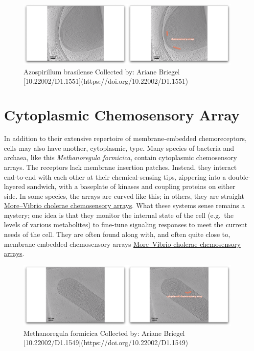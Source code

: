 \documentclass[]{tufte-book}
\begin{document}
\begin{figure}
\includegraphics{movie_stills/7_4a} \caption[Azospirillum brasilense Collected by]{Azospirillum brasilense Collected by: Ariane Briegel [10.22002/D1.1551](https://doi.org/10.22002/D1.1551)}\label{fig:unnamed-chunk-128}
\end{figure}

\section{Cytoplasmic Chemosensory
Array}\label{cytoplasmic-chemosensory-array}

In addition to their extensive repertoire of membrane-embedded
chemoreceptors, cells may also have another, cytoplasmic, type. Many
species of bacteria and archaea, like this \emph{Methanoregula
formicica}, contain cytoplasmic chemosensory arrays. The receptors lack
membrane insertion patches. Instead, they interact end-to-end with each
other at their chemical-sensing tips, zippering into a double-layered
sandwich, with a baseplate of kinases and coupling proteins on either
side. In some species, the arrays are curved like this; in others, they
are straight
\protect\hyperlink{morevibrio-cholerae-chemosensory-arrays}{More--Vibrio
cholerae chemosensory arrays}. What these systems sense remains a
mystery; one idea is that they monitor the internal state of the cell
(e.g.~the levels of various metabolites) to fine-tune signaling
responses to meet the current needs of the cell. They are often found
along with, and often quite close to, membrane-embedded chemosensory
arrays
\protect\hyperlink{morevibrio-cholerae-chemosensory-arrays}{More--Vibrio
cholerae chemosensory arrays}.

\begin{figure}
\includegraphics{movie_stills/7_5} \caption[Methanoregula formicica Collected by]{Methanoregula formicica Collected by: Ariane Briegel [10.22002/D1.1549](https://doi.org/10.22002/D1.1549)}\label{fig:unnamed-chunk-129}
\end{figure}
\end{document}
